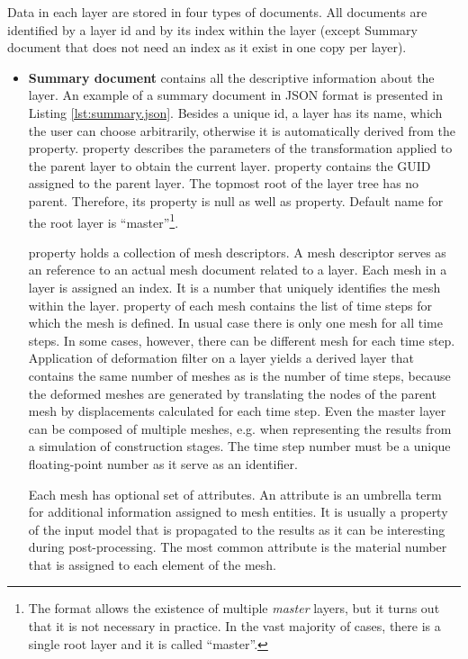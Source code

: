 
Data in each layer are stored in four types of documents. All documents are identified by a layer id and by its index within the layer (except Summary document that does not need an index as it exist in one copy per layer).
\begin{itemize}

    \item \textbf{Summary document} contains all the descriptive information about the layer. An example of a summary document in JSON format is presented in Listing \ref{lst:summary.json}. Besides a unique id, a layer has its name, which the user can choose arbitrarily, otherwise it is automatically derived from the  property.  property describes the parameters of the transformation applied to the parent layer to obtain the current layer.  property contains the GUID assigned to the parent layer. The topmost root of the layer tree has no parent. Therefore, its  property is null as well as  property. Default name for the root layer is ``master''\footnote{The format allows the existence of multiple \textit{master} layers, but it turns out that it is not necessary in practice. In the vast majority of cases, there is a single root layer and it is called ``master''.}.

     property holds a collection of mesh descriptors. A mesh descriptor serves as an reference to an actual mesh document related to a layer. Each mesh in a layer is assigned an index. It is a number that uniquely identifies the mesh within the layer.  property of each mesh contains the list of time steps for which the mesh is defined. In usual case there is only one mesh for all time steps. In some cases, however, there can be different mesh for each time step. Application of deformation filter on a layer yields a derived layer that contains the same number of meshes as is the number of time steps, because the deformed meshes are generated by translating the nodes of the parent mesh by displacements calculated for each time step. Even the master layer can be composed of multiple meshes, e.g. when representing the results from a simulation of construction stages. The time step number must be a unique floating-point number as it serve as an identifier.
    
    Each mesh has optional set of attributes. An attribute is an umbrella term for additional information assigned to mesh entities. It is usually a property of the input model that is propagated to the results as it can be interesting during post-processing. The most common attribute is the material number that is assigned to each element of the mesh.


\end{itemize}
